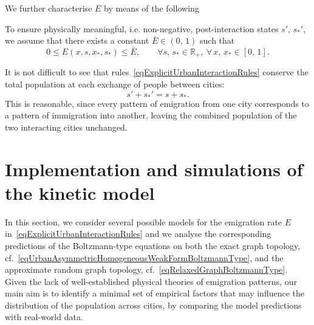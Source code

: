 \documentclass[a4paper]{article}
\newcommand{\R}{\mathbb{R}}
\begin{document}
We further characterise $E$ by means of the following
\begin{hyp} \label{hypEmigrationRateLimits}
To ensure physically meaningful, i.e. non-negative, post-interaction states $s',\,s_\ast'$, we assume that there exists a constant $\bar E\in (0,\,1)$ such that
$$ 0\leq E(x,s,x_\ast,s_\ast)\leq\bar E, \qquad \forall s,\,s_\ast\in\R_+,\ \forall\,x,\,x_\ast\in [0,\,1]. $$
\end{hyp}

It is not difficult to see that rules~\eqref{eqExplicitUrbanInteractionRules} conserve the total population at each exchange of people between cities:
$$ s'+s_\ast'=s+s_\ast. $$
This is reasonable, since every pattern of emigration from one city corresponds to a pattern of immigration into another, leaving the combined population of the two interacting cities unchanged.

\section{Implementation and simulations of the kinetic model}
\label{secImplementationSimulation}
%
In this section, we consider several possible models for the emigration rate $E$ in~\eqref{eqExplicitUrbanInteractionRules} and we analyse the corresponding predictions of the Boltzmann-type equations on both the exact graph topology, cf.~\eqref{eqUrbanAsymmetricHomogeneousWeakFormBoltzmannType}, and the approximate random graph topology, cf.~\eqref{eqRelaxedGraphBoltzmannType}. Given the lack of well-established physical theories of emigration patterns, our main aim is to identify a minimal set of empirical factors that may influence the distribution of the population across cities, by comparing the model predictions with real-world data.
\end{document}
